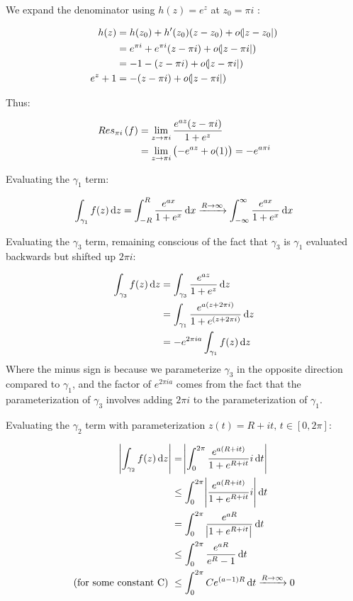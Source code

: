 \begin{example}
We expand the denominator using $h(z) = e^z$ at $z_0 = \pi i$ :

\begin{align*}
    h(z) &= h(z_0) + h'(z_0)(z-z_0) + o(\abs{z-z_0})\\
    &= e^{\pi i} + e^{\pi i} (z- \pi i) +  o(\abs{z-\pi i})\\
    &= -1 -(z-\pi i) + o(\abs{z-\pi i})\\
    e^z + 1 &= -(z-\pi i) + o(\abs{z-\pi i})\\
\end{align*}

Thus:

\begin{align*}
    Res_{\pi i} \left( f \right) &= \lim_{z \to \pi i} \frac{e^{az} (z-\pi i)}{1+e^z}\\
    &= \lim_{z \to \pi i} \left( -e^{az} + o(1) \right) = - e^{a\pi i}
\end{align*}

Evaluating the $\gamma_1$ term:

\begin{align*}
    \int_{\gamma_1} f(z) \dif z &= \int_{-R}^R \frac{e^{ax}}{1+e^x} \dif x \xrightarrow[]{R \to \infty } \int_{-\infty}^\infty \frac{e^{ax}}{1+e^x} \dif x\\
\end{align*}

Evaluating the $\gamma_3$ term, remaining conscious of the fact that $\gamma_3$ is $\gamma_1$ evaluated backwards but shifted up $2 \pi i$:

\begin{align*}
    \int_{\gamma_3} f(z) \dif z &= \int_{\gamma_3} \frac{e^{az}}{1+e^z} \dif z\\
    &= \int_{\gamma_1} \frac{e^{a(z+2\pi i)}}{1+e^{(z+2\pi i)}} \dif z\\
    &= - e^{2\pi i a} \int_{\gamma_1}  f(z) \dif z
\end{align*}
 Where the minus sign is because we parameterize $\gamma_3$ in the opposite direction compared to $\gamma_1$, and the factor of $e^{2\pi i a}$ comes from the fact that the parameterization of $\gamma_3$ involves adding $2\pi i$ to the parameterization of $\gamma_1$.

Evaluating the $\gamma_2$ term with parameterization $z(t) = R + it, \, t \in [0,2\pi ]$:

\begin{align*}
    \abs{\int_{\gamma_2} f(z) \dif z }&=\abs{ \int_0^{2\pi} \frac{e^{a(R+it)}}{1+e^{R+it}} i \dif t }\\
    &\leq  \int_0^{2\pi} \abs{ \frac{e^{a(R+it)}}{1+e^{R+it}} i} \dif t \\
    &= \int_0^{2\pi} \frac{e^{aR}}{\abs{ 1+e^{R+it} }} \dif t\\
    &\leq \int_0^{2\pi}  \frac{e^{aR}}{e^R -1 }       \dif t\\
    \text{(for some constant C) }&\leq \int_0^{2\pi}  C e^{(a-1)R}       \dif t \xrightarrow[]{R \to \infty} 0
\end{align*}


\end{example}
